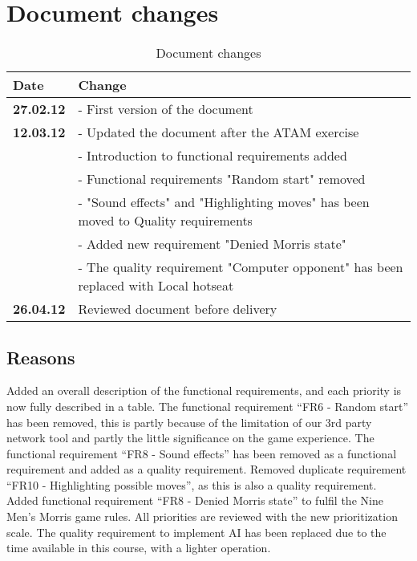 \newpage

\section{Document changes}

\begin{table}[h!]
\begin{tabular}{ | p{90pt} | p{270pt}  |}
\hline
\bf Date & \bf Change \\ \hline
\bf 27.02.12  & - First version of the document  \\ \hline
\bf 12.03.12 & - Updated the document after the ATAM exercise \\ 
& - Introduction to functional requirements added \\
& - Functional requirements "Random start" removed \\ 
& - "Sound effects" and "Highlighting moves" has been moved to Quality requirements \\
& - Added new requirement "Denied Morris state" \\ 
& - The quality requirement "Computer opponent" has been replaced with Local hotseat \\ \hline
\bf 26.04.12 & Reviewed document before delivery \\ \hline 

\end{tabular}
\caption{Document changes}
\end{table}

\subsection{Reasons}
Added an overall description of the functional requirements, and each priority is now fully described in a table. The functional requirement “FR6 - Random start” has been removed, this is partly because of the limitation of our 3rd party network tool and partly the little significance on the game experience. The functional requirement “FR8 - Sound effects” has been removed as a functional requirement and added as a quality requirement. Removed duplicate requirement “FR10 - Highlighting possible moves”, as this is also a quality requirement. Added functional requirement “FR8 - Denied Morris state” to fulfil the Nine Men’s Morris game rules. All priorities are reviewed with the new prioritization scale. The quality requirement to implement AI has been replaced due to the time available in this course, with a lighter operation.